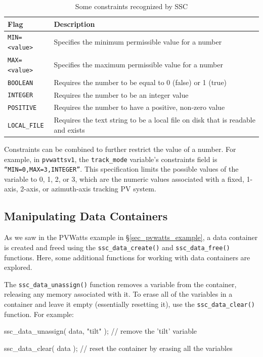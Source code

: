 \documentclass{article}
\begin{document}
\begin{table}[ht]
\begin{center}
\begin{tabular}{ll}
Flag & Description\\
\hline
\texttt{MIN=<value>} & Specifies the minimum permissible value for a number \\
\texttt{MAX=<value>} & Specifies the maximum permissible value for a number \\
\texttt{BOOLEAN} & Requires the number to be equal to 0 (false) or 1 (true) \\
\texttt{INTEGER} & Requires the number to be an integer value \\
\texttt{POSITIVE} & Requires the number to have a positive, non-zero value \\
\texttt{LOCAL\_FILE} & Requires the text string to be a local file on disk that is readable and exists \\
\end{tabular}
\caption{Some constraints recognized by SSC}
\label{tab_constraints}
\end{center}
\end{table}

Constraints can be combined to further restrict the value of a number.  For example, in \texttt{pvwattsv1}, the \texttt{track\_mode} variable's constraints field is \texttt{``MIN=0,MAX=3,INTEGER''}.  This specification limits the possible values of the variable to 0, 1, 2, or 3, which are the numeric values associated with a fixed, 1-axis, 2-axis, or azimuth-axis tracking PV system.

\subsection{Manipulating Data Containers}
\label{sec_data_manip}

As we saw in the PVWatts example in \S\ref{sec_pvwatts_example}, a data container is created and freed using the \texttt{ssc\_data\_create()} and \texttt{ssc\_data\_free()} functions.  Here, some additional functions for working with data containers are explored.

The \texttt{ssc\_data\_unassign()} function removes a variable from the container, releasing any memory associated with it.  To erase all of the variables in a container and leave it empty (essentially resetting it), use the \texttt{ssc\_data\_clear()} function.  For example:

\begin{verbatimtab}
ssc_data_unassign( data, "tilt" ); // remove the 'tilt' variable

ssc_data_clear( data ); // reset the container by erasing all the variables
\end{verbatimtab}
\end{document}
